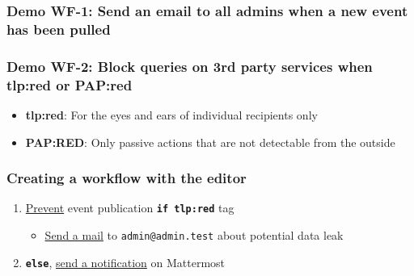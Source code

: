 \begin{frame}
    \frametitle{Demo WF-1: Send an email to \textbf{all admins} when a new event has been pulled}
     \begin{center}
    \end{center}
\end{frame}

\begin{frame}
    \frametitle{Demo WF-2: Block queries on 3rd party services when \textbf{tlp:red} or \textbf{PAP:red}}
    \begin{itemize}
        \small
        \item \textbf{tlp:red}: For the eyes and ears of individual recipients only
        \item \textbf{PAP:RED}: Only passive actions that are not detectable from the outside
    \end{itemize}
    \vspace*{1em}
     \begin{center}
    \end{center}
\end{frame}

\begin{frame}
    \frametitle{Creating a workflow with the editor}
    \begin{enumerate}
        \item \underline{Prevent} event publication \texttt{\bf \large if tlp:red} tag
        \begin{itemize}
            \item \underline{Send a mail} to \texttt{\scriptsize admin@admin.test} about potential data leak
        \end{itemize}
        \item \texttt{\bf \large else}, \underline{send a notification} on Mattermost
    \end{enumerate}
\end{frame}

